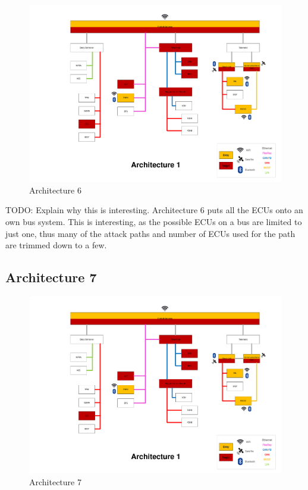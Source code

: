 \begin{figure}[h!]
    \caption{Architecture 6}
    \includegraphics[width=\textwidth, page=6]{../Architectures-survey.pdf}
\end{figure}

TODO: Explain why this is interesting.
Architecture 6 puts all the ECUs onto an own bus system.
This is interesting, as the possible ECUs on a bus are limited to just one, thus many of the attack paths and number of ECUs used for the path are trimmed down to a few.
\par


\subsection*{Architecture 7}
\label{sec:arch7}

\begin{figure}[h!]
    \caption{Architecture 7}
    \includegraphics[width=\textwidth, page=7]{../Architectures-survey.pdf}
\end{figure}

